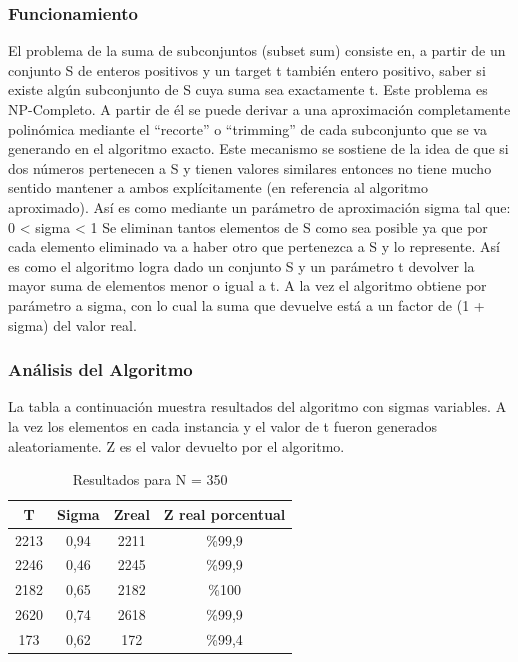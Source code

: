 \documentclass[a4paper, 10pt]{article}
\newcommand\tab[1][0.5cm]{\hspace*{#1}}
\begin{document}
            \subsubsection{Funcionamiento}
                \tab El problema de la suma de subconjuntos (subset sum) consiste en, a partir de un conjunto S de enteros 
                positivos y un target t también entero positivo, saber si existe algún subconjunto de S cuya suma sea 
                exactamente t. Este problema es NP-Completo.
                \tab A partir de él se puede derivar a una aproximación completamente polinómica mediante el “recorte” o 
                “trimming” de cada subconjunto que se va generando en el algoritmo exacto. Este mecanismo se sostiene de 
                la idea de que si dos números pertenecen a S y tienen valores similares entonces no tiene mucho sentido
                mantener a ambos explícitamente (en referencia al algoritmo aproximado). Así es como mediante un parámetro 
                de aproximación sigma tal que: 
                                                            0 < sigma < 1
                \tab Se eliminan tantos elementos de S como sea posible ya que por cada elemento eliminado va a haber otro
                que pertenezca a S y lo represente. Así es como el algoritmo logra dado un conjunto S y un parámetro t 
                devolver la mayor suma de elementos menor o igual a t. A la vez el algoritmo obtiene por parámetro a sigma,
                con lo cual la suma que devuelve está a un factor de (1 + sigma) del valor real.
            \subsubsection{Análisis del Algoritmo}
                \tab La tabla a continuación muestra resultados del algoritmo con sigmas variables. A la vez los elementos
                en cada instancia y el valor de t fueron generados aleatoriamente. Z es el valor devuelto por el algoritmo.

                \begin{table}[h!]
                    \centering
                    \caption{Resultados para N = 350}
                    \begin{tabular}{c|c|c|c}
                        T & Sigma & Zreal & Z real porcentual \\
                        \hline
                        2213 & 0,94 & 2211 & \%99,9 \\
                        \hline
                        2246 & 0,46 & 2245 & \%99,9 \\
                        \hline
                        2182 & 0,65 & 2182 & \%100 \\
                        \hline
                        2620 & 0,74 & 2618 & \%99,9 \\
                        \hline
                        173 & 0,62 & 172 & \%99,4 \\
                    \end{tabular}
                \end{table}
 
\end{document}
